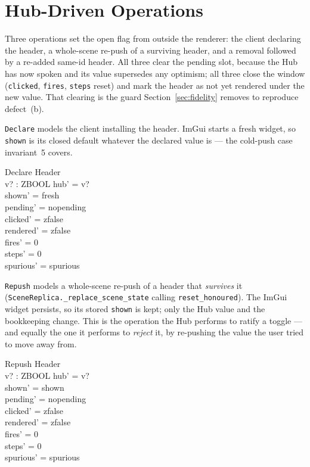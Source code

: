 \documentclass[a4paper,10pt,fleqn]{article}
\begin{document}
\section{Hub-Driven Operations}

Three operations set the open flag from outside the renderer: the client
declaring the header, a whole-scene re-push of a surviving header, and a
removal followed by a re-added same-id header.  All three clear the pending
slot, because the Hub has now spoken and its value supersedes any optimism;
all three close the window (\texttt{clicked}, \texttt{fires}, \texttt{steps}
reset) and mark the header as not yet rendered under the new value.  That
clearing is the guard Section~\ref{sec:fidelity} removes to reproduce
defect~(b).

\texttt{Declare} models the client installing the header.  ImGui starts a fresh
widget, so \texttt{shown} is its closed default whatever the declared value is
--- the cold-push case invariant~5 covers.

\begin{schema}{Declare}
  \Delta Header \\
  v? : ZBOOL
\where
  hub' = v? \\
  shown' = fresh \\
  pending' = nopending \\
  clicked' = zfalse \\
  rendered' = zfalse \\
  fires' = 0 \\
  steps' = 0 \\
  spurious' = spurious
\end{schema}

\texttt{Repush} models a whole-scene re-push of a header that \emph{survives}
it (\texttt{SceneReplica.\_replace\_scene\_state} calling
\texttt{reset\_honoured}).  The ImGui widget persists, so its stored
\texttt{shown} is kept; only the Hub value and the bookkeeping change.  This is
the operation the Hub performs to ratify a toggle --- and equally the one it
performs to \emph{reject} it, by re-pushing the value the user tried to move
away from.

\begin{schema}{Repush}
  \Delta Header \\
  v? : ZBOOL
\where
  hub' = v? \\
  shown' = shown \\
  pending' = nopending \\
  clicked' = zfalse \\
  rendered' = zfalse \\
  fires' = 0 \\
  steps' = 0 \\
  spurious' = spurious
\end{schema}
\end{document}
